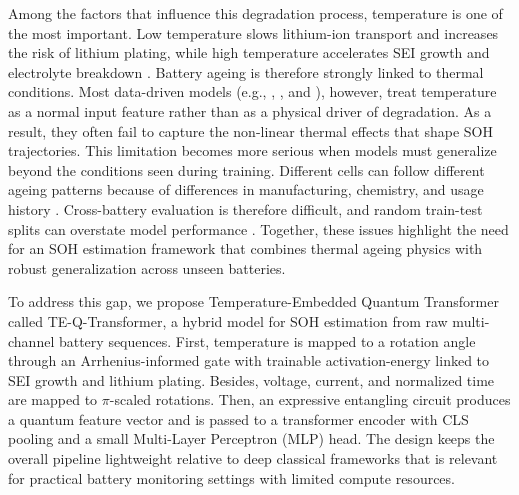 \documentclass[a4paper,fleqn]{cas-sc}
\begin{document}
Among the factors that influence this degradation process, temperature is one of the most important. Low temperature slows lithium-ion transport and increases the risk of lithium plating, while high temperature accelerates SEI growth and electrolyte breakdown \citep{kumar2024,asiri2025}. Battery ageing is therefore strongly linked to thermal conditions. Most data-driven models (e.g., \citep{liu2025multi}, \citep{li2025unified}, \citep{yang2025physics} and \citep{sun2025battery}), however, treat temperature as a normal input feature rather than as a physical driver of degradation. As a result, they often fail to capture the non-linear thermal effects that shape SOH trajectories. This limitation becomes more serious when models must generalize beyond the conditions seen during training. Different cells can follow different ageing patterns because of differences in manufacturing, chemistry, and usage history \citep{lu2024mechanisms}. Cross-battery evaluation is therefore difficult, and random train-test splits can overstate model performance \citep{sedlavrik2025advanced}. Together, these issues highlight the need for an SOH estimation framework that combines thermal ageing physics with robust generalization across unseen batteries.

To address this gap, we propose Temperature-Embedded Quantum Transformer called TE-Q-Transformer, a hybrid model for SOH estimation from raw multi-channel battery sequences. First, temperature is mapped to a rotation angle through an Arrhenius-informed gate with trainable activation-energy linked to SEI growth and lithium plating. Besides, voltage, current, and normalized time are mapped to $\pi$-scaled rotations. Then, an expressive entangling circuit produces a quantum feature vector and is passed to a transformer encoder with CLS pooling and a small Multi-Layer Perceptron (MLP) head. The design keeps the overall pipeline lightweight relative to deep classical frameworks that is relevant for practical battery monitoring settings with limited compute resources.

\end{document}
